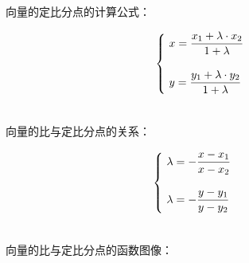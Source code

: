 \documentclass[UTF8]{ctexart}
\begin{document}
    向量的定比分点的计算公式：
    \begin{large}
        \begin{equation*}
            \begin{cases}
                ~x=\dfrac{x_1+\lambda\cdot x_2}{1+\lambda}\\[6mm]
                ~y=\dfrac{y_1+\lambda\cdot y_2}{1+\lambda}\vspace{2pt}
            \end{cases}
        \end{equation*}
    \end{large}\\
    向量的比与定比分点的关系：
    \begin{large}
        \begin{equation*}
            \begin{cases}
                ~\lambda=-\dfrac{x-x_1}{x-x_2}\\[6mm]
                ~\lambda=-\dfrac{y-y_1}{y-y_2}\vspace{2pt}
            \end{cases}~~~~
        \end{equation*}
    \end{large}\\
    向量的比与定比分点的函数图像：
\end{document}
